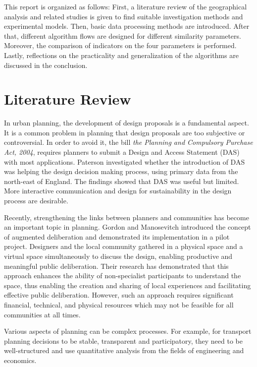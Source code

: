 \marginLeft{}
This report is organized as follows: First, a literature review of the geographical analysis and related studies is given to find suitable investigation methods and experimental models. Then, basic data processing methods are introduced. After that, different algorithm flows are designed for different similarity parameters. Moreover, the comparison of indicators on the four parameters is performed. Lastly, reflections on the practicality and generalization of the algorithms are discussed in the conclusion.  

\section*{Literature Review}
In urban planning, the development of design proposals is a fundamental aspect. It is a common problem in planning that design proposals are too subjective or controversial. In order to avoid it, the bill \textit{the Planning and Compulsory Purchase Act, 2004}, requires planners to submit a Design and Access Statement (DAS) with most applications. Paterson\cite{bib4} investigated whether the introduction of DAS was helping the design decision making process, using primary data from the north-east of England. The findings showed that DAS was useful but limited. More interactive communication and design for sustainability in the design process are desirable.

Recently, strengthening the links between planners and communities has become an important topic in planning. Gordon and Manosevitch\cite{bib5} introduced the concept of augmented deliberation and demonstrated its implementation in a pilot project. Designers and the local community gathered in a physical space and a virtual space simultaneously to discuss the design, enabling productive and meaningful public deliberation. Their research has demonstrated that this approach enhances the ability of non-specialist participants to understand the space, thus enabling the creation and sharing of local experiences and facilitating effective public deliberation. However, such an approach requires significant financial, technical, and physical resources which may not be feasible for all communities at all times.

Various aspects of planning can be complex processes. For example, for transport planning decisions to be stable, transparent and participatory, they need to be well-structured and use quantitative analysis from the fields of engineering and economics.\cite{bib6}

